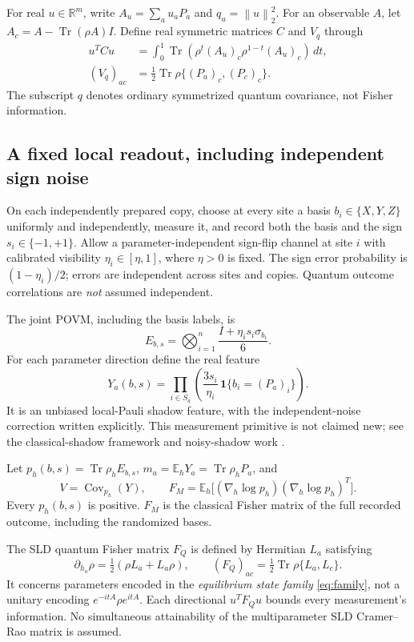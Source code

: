 \documentclass[11pt,a4paper]{article}
\theoremstyle{remark}
\newcommand{\Tr}{\operatorname{Tr}}
\newcommand{\Cov}{\operatorname{Cov}}
\newcommand{\E}{\mathbb E}
\newcommand{\R}{\mathbb R}
\newcommand{\norm}[1]{\left\lVert #1\right\rVert}
\begin{document}
For real $u\in\R^m$, write $A_u=\sum_a u_aP_a$ and $q_u=\norm{u}_2^2$. For an observable $A$, let $A_c=A-\Tr(\rho A)I$. Define real symmetric matrices $C$ and $V_q$ through
\begin{align}
 u^TCu&=\int_0^1\Tr(\rho^t(A_u)_c\rho^{1-t}(A_u)_c)\,dt,\label{eq:C}\\
 (V_q)_{ac}&=\tfrac12\Tr\rho\{(P_a)_c,(P_c)_c\}.
 \label{eq:Vq}
\end{align}
The subscript $q$ denotes ordinary symmetrized quantum covariance, not Fisher information.

\subsection{A fixed local readout, including independent sign noise}
On each independently prepared copy, choose at every site a basis $b_i\in\{X,Y,Z\}$ uniformly and independently, measure it, and record both the basis and the sign $s_i\in\{-1,+1\}$. Allow a parameter-independent sign-flip channel at site $i$ with calibrated visibility $\eta_i\in[\eta,1]$, where $\eta>0$ is fixed. The sign error probability is $(1-\eta_i)/2$; errors are independent across sites and copies. Quantum outcome correlations are \emph{not} assumed independent.

The joint POVM, including the basis labels, is
\begin{equation}
 E_{b,s}=\bigotimes_{i=1}^n\frac{I+\eta_i s_i\sigma_{b_i}}6.
 \label{eq:POVM}
\end{equation}
For each parameter direction define the real feature
\begin{equation}
 Y_a(b,s)=\prod_{i\in S_a}
 \left(\frac{3s_i}{\eta_i}\,\mathbf1\{b_i=(P_a)_i\}\right).
 \label{eq:feature}
\end{equation}
It is an unbiased local-Pauli shadow feature, with the independent-noise correction written explicitly. This measurement primitive is not claimed new; see the classical-shadow framework \cite{HKP} and noisy-shadow work \cite{KohGrewal}.

Let $p_h(b,s)=\Tr\rho_hE_{b,s}$, $m_a=\E_hY_a=\Tr\rho_hP_a$, and
\begin{equation}
 V=\Cov_{p_h}(Y),\qquad
 F_M=\E_h\big[(\nabla_h\log p_h)(\nabla_h\log p_h)^T\big].
 \label{eq:VFM}
\end{equation}
Every $p_h(b,s)$ is positive. $F_M$ is the classical Fisher matrix of the full recorded outcome, including the randomized bases.

The SLD quantum Fisher matrix $F_Q$ is defined by Hermitian $L_a$ satisfying
\begin{equation}
 \partial_{h_a}\rho=\tfrac12(\rho L_a+L_a\rho),\qquad
 (F_Q)_{ac}=\tfrac12\Tr\rho\{L_a,L_c\}.
 \label{eq:SLD}
\end{equation}
It concerns parameters encoded in the \emph{equilibrium state family} \eqref{eq:family}, not a unitary encoding $e^{-itA}\rho e^{itA}$. Each directional $u^TF_Qu$ bounds every measurement's information. No simultaneous attainability of the multiparameter SLD Cramer--Rao matrix is assumed.
\end{document}
